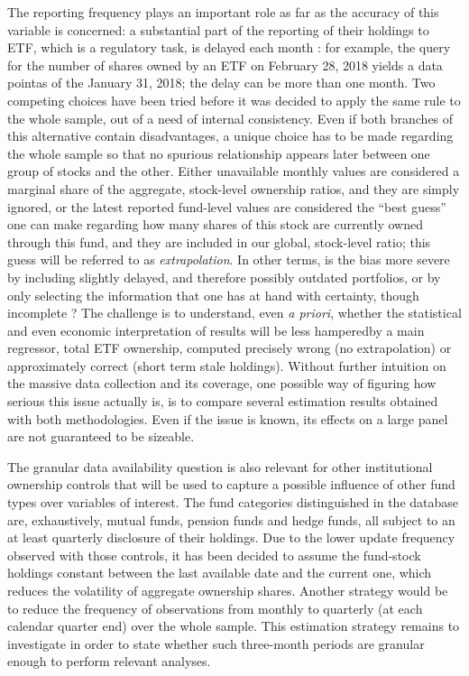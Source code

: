 The reporting frequency plays an important role as far as the accuracy of this variable is concerned: a substantial part of the reporting of their holdings to ETF, which is a regulatory task, is delayed each month : for example, the query for the number of shares owned by an ETF on February 28, 2018 yields a data pointas of the January 31, 2018; the delay can be more than one month. Two competing choices have been tried before it was decided to apply the same rule to the whole sample, out of a need of internal consistency. Even if both branches of this alternative contain disadvantages, a unique choice has to be made regarding the whole sample so that no spurious relationship appears later between one group of stocks and the other. Either unavailable monthly values are considered a marginal share of the aggregate, stock-level ownership ratios, and they are simply ignored, or the latest reported fund-level values are considered the ``best guess'' one can make regarding how many shares of this stock are currently owned through this fund, and they are included in our global, stock-level ratio; this guess will be referred to as \textit{extrapolation}. In other terms, is the bias more severe by including slightly delayed, and therefore possibly outdated portfolios, or by only selecting the information that one has at hand with certainty, though incomplete ? The challenge is to understand, even \textit{a priori}, whether the statistical and even economic interpretation of results will be less hamperedby a main regressor, total ETF ownership, computed precisely wrong (no extrapolation) or approximately correct (short term stale holdings). Without further intuition on the massive data collection and its coverage, one possible way of figuring how serious this issue actually is, is to compare several estimation results obtained with both methodologies. Even if the issue is known, its effects on a large panel are not guaranteed to be sizeable. 

The granular data availability question is also relevant for other institutional ownership controls that will be used to capture a possible influence of other fund types over variables of interest. The fund categories distinguished in the database are, exhaustively, mutual funds, pension funds and hedge funds, all subject to an at least quarterly disclosure of their holdings. Due to the lower update frequency observed with those controls, it has been decided to assume the fund-stock holdings constant between the last available date and the current one, which reduces the volatility of aggregate ownership shares. Another strategy would be to reduce the frequency of observations from monthly to quarterly (at each calendar quarter end) over the whole sample. This estimation strategy remains to investigate in order to state whether such three-month periods are granular enough to perform relevant analyses.
